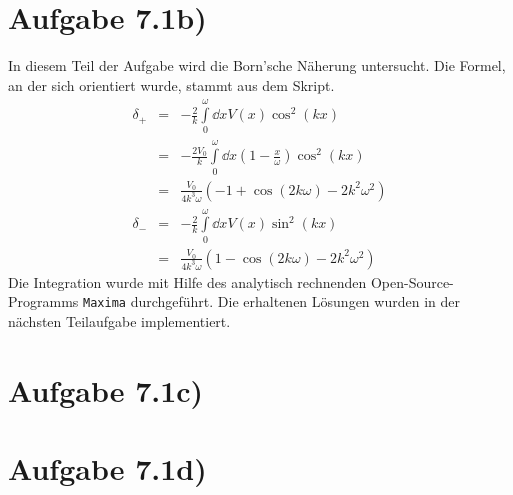 \section*{Aufgabe 7.1b)}
In diesem Teil der Aufgabe wird die Born'sche Näherung untersucht. Die Formel, an
der sich orientiert wurde, stammt aus dem Skript.
\begin{eqnarray}
δ_+ &=& -\frac{2}{k}\int\limits_0^ω\dd{x}V(x)\cos^2(kx)\\
&=& -\frac{2 V_0}{k}\int\limits_0^ω\dd{x}(1-\frac{x}{ω})\cos^2(kx)\\
&=& \frac{V_0}{4k^3 ω} \left(-1 + \cos(2kω) - 2k^2 ω^2\right)\\
δ_- &=& -\frac{2}{k}\int\limits_0^ω\dd{x}V(x)\sin^2(kx)\\
&=& \frac{V_0}{4k^3 ω} \left(1 - \cos(2kω) - 2k^2 ω^2\right)
\end{eqnarray}
Die Integration wurde mit Hilfe des analytisch rechnenden Open-Source-Programms
\texttt{Maxima} durchgeführt. Die erhaltenen Lösungen wurden in der nächsten
Teilaufgabe implementiert.

\section*{Aufgabe 7.1c)}

\section*{Aufgabe 7.1d)}